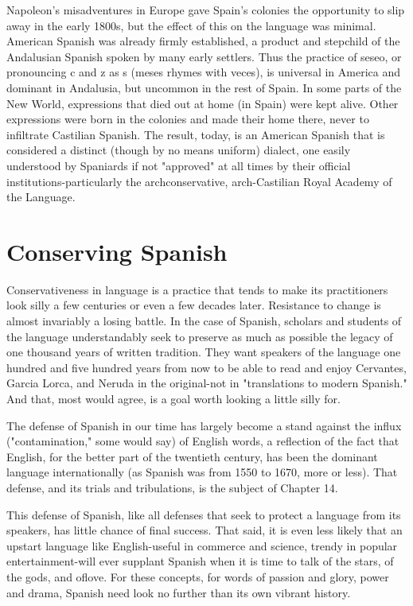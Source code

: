 Napoleon's misadventures in Europe gave Spain's colonies the
opportunity to slip away in the early 1800s, but the effect of this on
the language was minimal. American Spanish was already firmly established, a product and stepchild of the Andalusian Spanish spoken by
many early settlers. Thus the practice of seseo, or pronouncing c and z
as s (meses rhymes with veces), is universal in America and dominant
in Andalusia, but uncommon in the rest of Spain. In some parts of the
New World, expressions that died out at home (in Spain) were kept
alive. Other expressions were born in the colonies and made their
home there, never to infiltrate Castilian Spanish. The result, today, is
an American Spanish that is considered a distinct (though by no means
uniform) dialect, one easily understood by Spaniards if not "approved"
at all times by their official institutions-particularly the archconservative, arch-Castilian Royal Academy of the Language.

\section{Conserving Spanish}

Conservativeness in language is a practice that tends to make
its practitioners look silly a few centuries or even a few decades later.
Resistance to change is almost invariably a losing battle. In the case of
Spanish, scholars and students of the language understandably seek to
preserve as much as possible the legacy of one thousand years of written tradition. They want speakers of the language one hundred and five
hundred years from now to be able to read and enjoy Cervantes, Garcia
Lorca, and Neruda in the original-not in "translations to modern
Spanish." And that, most would agree, is a goal worth looking a little
silly for.

The defense of Spanish in our time has largely become a stand
against the influx ("contamination," some would say) of English words,
a reflection of the fact that English, for the better part of the twentieth
century, has been the dominant language internationally (as Spanish
was from 1550 to 1670, more or less). That defense, and its trials and
tribulations, is the subject of Chapter 14.

This defense of Spanish, like all defenses that seek to protect a
language from its speakers, has little chance of final success. That said,
it is even less likely that an upstart language like English-useful in
commerce and science, trendy in popular entertainment-will ever
supplant Spanish when it is time to talk of the stars, of the gods, and
oflove. For these concepts, for words of passion and glory, power and
drama, Spanish need look no further than its own vibrant history.

